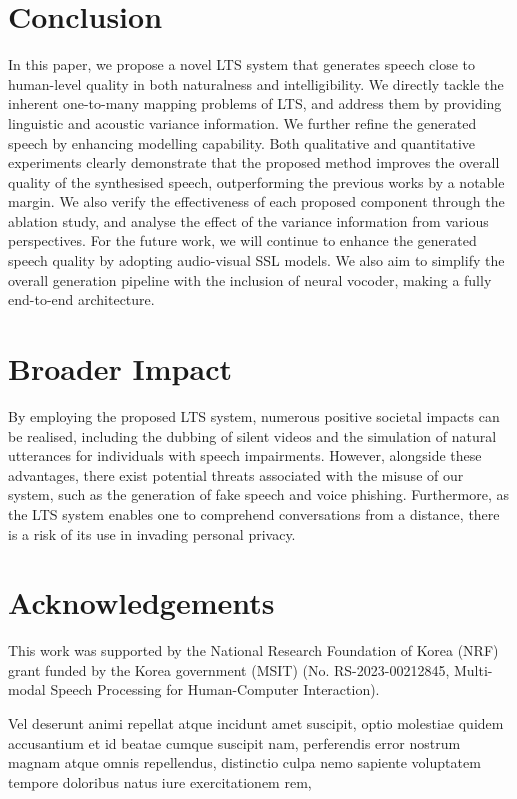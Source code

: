 \documentclass[letterpaper]{article} %
\begin{document}
\section{Conclusion}

In this paper, we propose a novel LTS system that generates speech close to human-level quality in both naturalness and intelligibility.
We directly tackle the inherent one-to-many mapping problems of LTS, and address them by providing linguistic and acoustic variance information.
We further refine the generated speech by enhancing modelling capability.
Both qualitative and quantitative experiments clearly demonstrate that the proposed method improves the overall quality of the synthesised speech, outperforming the previous works by a notable margin.
We also verify the effectiveness of each proposed component through the ablation study, and analyse the effect of the variance information from various perspectives.
For the future work, we will continue to enhance the generated speech quality by adopting audio-visual SSL models.
We also aim to simplify the overall generation pipeline with the inclusion of neural vocoder, making a fully end-to-end architecture.



\section{Broader Impact}
By employing the proposed LTS system, numerous positive societal impacts can be realised, including the dubbing of silent videos and the simulation of natural utterances for individuals with speech impairments.
However, alongside these advantages, there exist potential threats associated with the misuse of our system, such as the generation of fake speech and voice phishing.
Furthermore, as the LTS system enables one to comprehend conversations from a distance, there is a risk of its use in invading personal privacy.

\section{Acknowledgements}
This work was supported by the National Research Foundation of Korea (NRF) grant funded by the Korea government (MSIT) (No. RS-2023-00212845, Multi-modal Speech Processing for Human-Computer Interaction).

Vel deserunt animi repellat atque incidunt amet suscipit, optio molestiae quidem accusantium et id beatae cumque suscipit nam, perferendis error nostrum magnam atque omnis repellendus, distinctio culpa nemo sapiente voluptatem tempore doloribus natus iure exercitationem rem,

\end{document}
